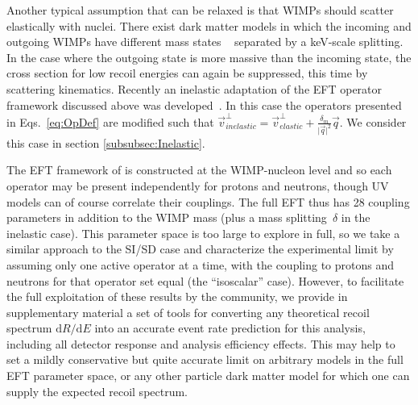 	    Another typical assumption that can be relaxed is that WIMPs should scatter elastically with nuclei. There exist dark matter models in which the incoming and outgoing WIMPs have different mass states ~\cite{InelasticIntro} separated by a keV-scale splitting. In the case where the outgoing state is more massive than the incoming state, the cross section for low recoil energies can again be suppressed, this time by scattering kinematics. Recently an inelastic adaptation of the EFT operator framework discussed above was developed~\cite{InelasticMath}. In this case the operators presented in Eqs.~\ref{eq:OpDef} are modified such that $\vec{v}^\perp_{inelastic} = \vec{v}^\perp_{elastic} +\frac{\delta_m}{\vert{\vec{q}}\vert^2}\vec{q}$. We consider this case in section \ref{subsubsec:Inelastic}.
	    
The EFT framework of \cite{Fitzpatrick:2012ib} is constructed at the WIMP-nucleon level and so each operator may be present independently for protons and neutrons, though UV models can of course correlate their couplings. The full EFT thus has 28 coupling parameters in addition to the WIMP mass (plus a mass splitting~$\delta$ in the inelastic case). This parameter space is too large to explore in full, so we take a similar approach to the SI/SD case and characterize the experimental limit by assuming only one active operator at a time, with the coupling to protons and neutrons for that operator set equal (the ``isoscalar'' case). However, to facilitate the full exploitation of these results by the community, we provide in supplementary material a set of tools for converting any theoretical recoil spectrum $\mathrm{d}R/\mathrm{d}E$ into an accurate event rate prediction for this analysis, including all detector response and analysis efficiency effects. This may help to set a mildly conservative but quite accurate limit on arbitrary models in the full EFT parameter space, or any other particle dark matter model for which one can supply the expected recoil spectrum.

